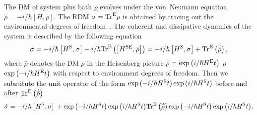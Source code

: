 \documentclass[12pt,twoside,a4paper]{report}
\begin{document}
The  DM of system plus bath $\rho$
evolves under the von~Neumann  equation \cite{neum32}
$%
\dot{\rho}
            =
               -  i/\hbar \left[ H,\rho \right] 
$. %
The RDM  
$%
\sigma 
        = 
            {\rm Tr}^{\rm E} \rho   
$ %
is obtained by tracing out the environmental degrees of freedom~\cite{blum96}.
The coherent and dissipative dynamics of the system
is described by the following equation 
\begin{equation} 
\dot{\sigma}
              =
                 -  i/\hbar 
                    \left[ H^{\rm S},\sigma \right] 
                 -  i/\hbar 
                    {\rm Tr}^{\rm E}
                    \left( 
                        \left[ H^{\rm SE},\bar{\rho }\right] 
                    \right) 
             =
                 -  i/\hbar 
                    \left[ H^{\rm S},\sigma \right] 
                 +  {\rm Tr}^{\rm E}
                    \left( \dot{\bar{\rho}}\right), 
\end{equation} 
where $\bar \rho$  denotes the DM $\rho$ in the Heisenberg picture  
$
\bar{\rho}
            =
                \exp \left(  i/\hbar H^{\rm E}t\right)  
$
$
                \rho
$
$
                \exp{\left( -i/\hbar H^{\rm E}t\right)}
$
with  respect to environment degrees of freedom.
Then we substitute the unit operator
of the form $\exp{(-i/\hbar H^{\rm S}t)}   
            \exp{( i/\hbar H^{\rm S}t)}$
before and after 
$
 {\rm Tr}^{\rm E}    \left(   \dot{\bar{\rho}}    \right)$
\begin{equation} 
\dot{\sigma} 
              =
                    -   i/\hbar 
                        \left[ H^{\rm S},\sigma \right]  \label{heis} \\ 
                    +    \exp{\left( -i/\hbar H^{\rm S}t\right)}
                         \exp{\left( i/\hbar H^{\rm S}t\right)} 
                        {\rm Tr}^{\rm E}       
                        \left(   \dot{\bar{\rho}}    \right)  
                         \exp{\left(  -i/\hbar H^{\rm S}t\right)}  
                        \exp{\left( i/\hbar H^{\rm S}t\right)}.  \nonumber  
\end{equation} 
\end{document}
